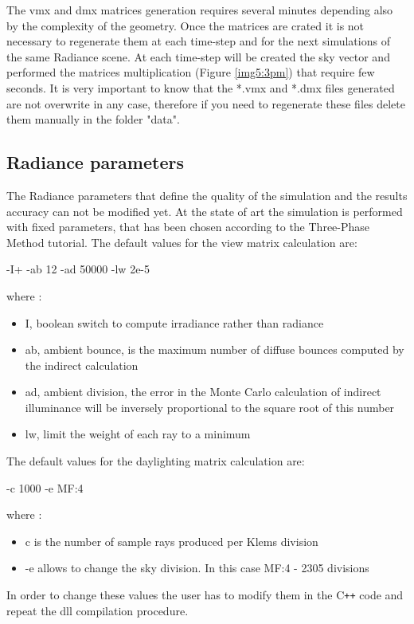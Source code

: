 The vmx and dmx matrices generation requires several minutes depending also by the complexity of the geometry. Once the matrices are crated it is not necessary to regenerate them at each time-step and for the next simulations of the same Radiance scene. At each time-step will be created the sky vector and performed the matrices multiplication (Figure \ref{img5:3pm}) that require few seconds.
It is very important to know that the *.vmx and *.dmx files generated are not overwrite in any case, therefore if you need to regenerate these files delete them manually in the folder "data".\\

\subsection{Radiance parameters}
The Radiance parameters that define the quality of the simulation and the results accuracy can not be modified yet. At the state of art the simulation is performed with fixed parameters, that has been chosen according to the Three-Phase Method tutorial. The default values for the view matrix calculation are:

\begin{center}
-I+ -ab 12 -ad 50000 -lw 2e-5
\end{center}

where \cite{rad_tut}:
\begin{itemize}
\renewcommand{\labelitemi}{\tiny$\blacksquare$}
\item I, boolean switch to compute irradiance rather than radiance
\item ab, ambient bounce, is the maximum number of diffuse bounces computed by the indirect calculation
\item ad, ambient division, the error in the Monte Carlo calculation of indirect illuminance will be inversely proportional to the square root of this number
\item lw, limit the weight of each ray to a minimum
\end{itemize}

The default values for the daylighting matrix calculation are: 
\begin{center}
-c 1000 -e MF:4
\end{center}
where \cite{3ph_tut}: 
\begin{itemize}
\renewcommand{\labelitemi}{\tiny$\blacksquare$}
\item c is the number of sample rays produced per Klems division
\item -e allows to change the sky division. In this case MF:4 - 2305 divisions
\end{itemize}

In order to change these values the user has to modify them in the C\texttt{++} code and repeat the dll compilation procedure.